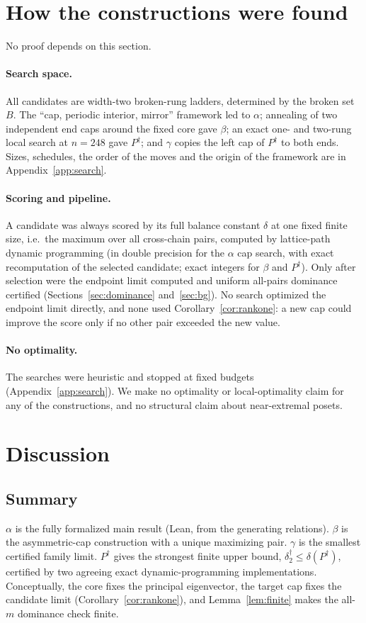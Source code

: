 \documentclass[11pt]{amsart}
\theoremstyle{definition}
\theoremstyle{remark}
\newcommand{\deltadag}{\delta_2^{\dagger}}
\begin{document}
\section{How the constructions were found}\label{sec:search}
No proof depends on this section.

\paragraph{Search space.} All candidates are width-two broken-rung ladders, determined by the broken set $B$. The ``cap, periodic interior, mirror'' framework led to $\alpha$; annealing of two independent end caps around the fixed core gave $\beta$; an exact one- and two-rung local search at $n=248$ gave $P^\dagger$; and $\gamma$ copies the left cap of $P^\dagger$ to both ends. Sizes, schedules, the order of the moves and the origin of the framework are in Appendix~\ref{app:search}.

\paragraph{Scoring and pipeline.} A candidate was always scored by its full balance constant $\delta$ at one fixed finite size, i.e.\ the maximum over all cross-chain pairs, computed by lattice-path dynamic programming (in double precision for the $\alpha$ cap search, with exact recomputation of the selected candidate; exact integers for $\beta$ and $P^\dagger$). Only after selection were the endpoint limit computed and uniform all-pairs dominance certified (Sections~\ref{sec:dominance} and~\ref{sec:bg}). No search optimized the endpoint limit directly, and none used Corollary~\ref{cor:rankone}: a new cap could improve the score only if no other pair exceeded the new value.

\paragraph{No optimality.} The searches were heuristic and stopped at fixed budgets (Appendix~\ref{app:search}). We make no optimality or local-optimality claim for any of the constructions, and no structural claim about near-extremal posets.

\section{Discussion}\label{sec:disc}

\subsection*{Summary} $\alpha$ is the fully formalized main result (Lean, from the generating relations). $\beta$ is the asymmetric-cap construction with a unique maximizing pair. $\gamma$ is the smallest certified family limit. $P^\dagger$ gives the strongest finite upper bound, $\deltadag\le\delta(P^\dagger)$, certified by two agreeing exact dynamic-programming implementations. Conceptually, the core fixes the principal eigenvector, the target cap fixes the candidate limit (Corollary~\ref{cor:rankone}), and Lemma~\ref{lem:finite} makes the all-$m$ dominance check finite.
\end{document}
